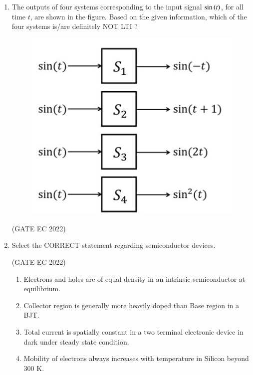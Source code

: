 \documentclass[journal,12pt,onecolumn]{IEEEtran}
\theoremstyle{remark}
\begin{document}
\begin{enumerate}
    \item The outputs of four systems  corresponding to the input signal $\sin\left(t\right)$, for all time $t$, are shown in the figure. Based on the given information, which of the four systems is/are definitely NOT LTI ?
    \begin{figure}[H]
        \centering
        \includegraphics[width=0.5\columnwidth]{figs/m22.jpg}
        \caption*{}
        \label{fig:m22}
    \end{figure}
    
    \hfill{(GATE EC 2022)}
    \begin{enumerate}
    \end{enumerate}

    \item Select the CORRECT statement regarding semiconductor devices.
    
    \hfill{(GATE EC 2022)}
    \begin{enumerate}
        \item Electrons and holes are of equal density in an intrinsic semiconductor at equilibrium.
        \item Collector region is generally more heavily doped than Base region in a BJT.
        \item Total current is spatially constant in a two terminal electronic device in dark under steady state condition.
        \item Mobility of electrons always increases with temperature in Silicon beyond 300 K.
    \end{enumerate}


\end{enumerate}
\end{document}
